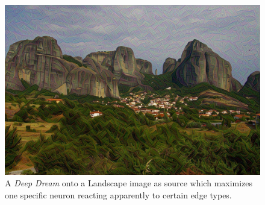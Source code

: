 \begin{figure}[H]
	\centering
	\includegraphics[width=0.5\linewidth]{img/applied_neuron.jpg}
	\caption{A \textit{Deep Dream} onto a Landscape image as source which maximizes one specific neuron reacting apparently to certain edge types.}
	\label{fig:applieddream}
\end{figure}

